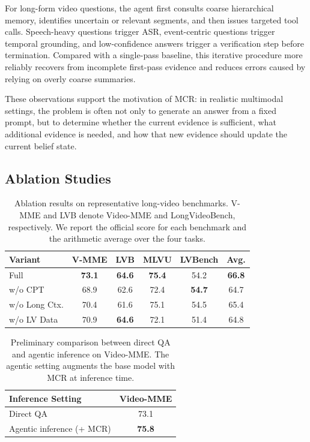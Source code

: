 \documentclass[11pt, letterpaper]{template}
\theoremstyle{plain}
\theoremstyle{definition}
\theoremstyle{remark}
\begin{document}
For long-form video questions, the agent first consults coarse hierarchical memory, identifies uncertain or relevant segments, and then issues targeted tool calls. Speech-heavy questions trigger ASR, event-centric questions trigger temporal grounding, and low-confidence answers trigger a verification step before termination. Compared with a single-pass baseline, this iterative procedure more reliably recovers from incomplete first-pass evidence and reduces errors caused by relying on overly coarse summaries.

These observations support the motivation of MCR: in realistic multimodal settings, the problem is often not only to generate an answer from a fixed prompt, but to determine whether the current evidence is sufficient, what additional evidence is needed, and how that new evidence should update the current belief state.


\subsection{Ablation Studies} 


\begin{table}[t]
    \centering
    \renewcommand{\arraystretch}{1.1}
    \setlength{\tabcolsep}{2.2mm}
    \small
    \begin{tabular}{lccccc}
        \toprule
        \textbf{Variant} & \textbf{V-MME} & \textbf{LVB} & \textbf{MLVU} & \textbf{LVBench} & \textbf{Avg.} \\
        \midrule
        Full & \textbf{73.1} & \textbf{64.6} & \textbf{75.4} & 54.2 & \textbf{66.8} \\
        w/o CPT & 68.9 & 62.6 & 72.4 & \textbf{54.7} & 64.7 \\
        w/o Long Ctx. & 70.4 & 61.6 & 75.1 & 54.5 & 65.4 \\
        w/o LV Data & 70.9 & \textbf{64.6} & 72.1 & 51.4 & 64.8 \\
        
        \bottomrule
    \end{tabular}
    \caption{Ablation results on representative long-video benchmarks. V-MME and LVB denote Video-MME and LongVideoBench, respectively. We report the official score for each benchmark and the arithmetic average over the four tasks.}
    \label{tab:ablation_studies}
\end{table}

\begin{table}[t]
    \centering
    \small
    \renewcommand{\arraystretch}{1.1}
    \setlength{\tabcolsep}{4mm}
    \begin{tabular}{lc}
        \toprule
        \textbf{Inference Setting} & \textbf{Video-MME} \\
        \midrule
        Direct QA & 73.1 \\
        Agentic inference (+ MCR) & \textbf{75.8} \\
        \bottomrule
    \end{tabular}
    \caption{Preliminary comparison between direct QA and agentic inference on Video-MME. The agentic setting augments the base model with MCR at inference time.}
    \label{tab:agentic_videomme}
\end{table}
\end{document}
